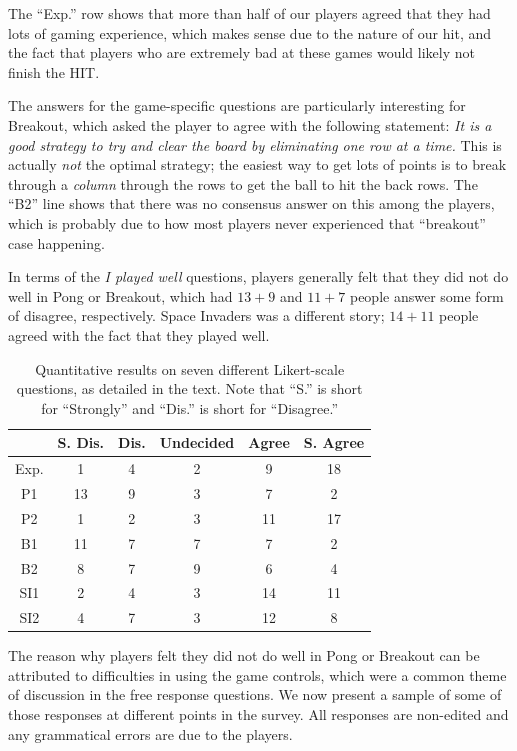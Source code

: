 \documentclass[letterpaper, 10 pt, conference]{ieeeconf}  %
\begin{document}
The ``Exp.'' row shows that more than half of our players agreed that they had lots of gaming
experience, which makes sense due to the nature of our hit, and the fact that players who are
extremely bad at these games would likely not finish the HIT.

The answers for the game-specific questions are particularly interesting for Breakout, which asked
the player to agree with the following statement: \emph{It is a good strategy to try and clear the
board by eliminating one row at a time.} This is actually \emph{not} the optimal strategy; the
easiest way to get lots of points is to break through a \emph{column} through the rows to get the
ball to hit the back rows. The ``B2'' line shows that there was no consensus answer on this among
the players, which is probably due to how most players never experienced that ``breakout'' case
happening.

In terms of the \emph{I played well} questions, players generally felt that they did not do well in
Pong or Breakout, which had $13+9$ and $11+7$ people answer some form of disagree, respectively.
Space Invaders was a different story; $14+11$ people agreed with the fact that they played well.

\begin{table}[t]
\centering
\begin{tabular}{|c||c|c|c|c|c|}
\hline
  & S. Dis. & Dis. & Undecided & Agree & S. Agree \\
\hline
Exp. & 1  & 4 & 2 & 9 & 18  \\
\hline
P1 & 13 & 9 & 3 & 7 & 2 \\
P2 & 1 & 2 & 3 & 11 & 17 \\
\hline
B1 & 11 & 7 & 7 & 7 & 2 \\
B2 & 8 &  7 & 9 & 6 & 4 \\
\hline
SI1 & 2 & 4 & 3 & 14 & 11 \\
SI2 & 4 & 7 & 3 & 12 & 8 \\
\hline
\end{tabular}
\caption{Quantitative results on seven different Likert-scale questions, as detailed in the text.
Note that ``S.'' is short for ``Strongly'' and ``Dis.'' is short for ``Disagree.''}
\label{tab:human_results}
\end{table}

The reason why players felt they did not do well in Pong or Breakout can be attributed to
difficulties in using the game controls, which were a common theme of discussion in the free
response questions. We now present a sample of some of those responses at different points in the
survey. All responses are non-edited and any grammatical errors are due to the players.
\end{document}
